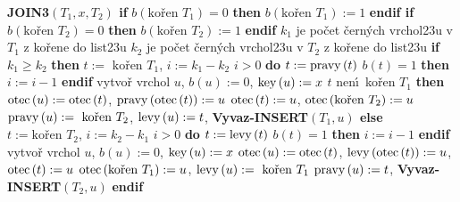 {\bf JOIN3$\left(T_1,x,T_2\right)$\newline 
if} $b\left(\text{ko\v ren }T_1\right)=0$ {\bf then} $b\left(\text{ko\v ren }T_1\right)
:=1$ {\bf endif\newline 
if} $b\left(\text{ko\v ren }T_2\right)=0$ {\bf then} $b\left(\text{ko\v ren }T_2\right)
:=1$ {\bf endif}\newline 
$k_1$ je po\v cet \v cern\'ych vrchol\accent23u v $T_1$ z ko\v rene do list\accent23u \newline 
$k_2$ je po\v cet \v cern\'ych vrchol\accent23u v $T_2$ z ko\v rene do list\accent23u \newline 
{\bf if} $k_1\ge k_2$ {\bf then}\newline 
\phantom{---}$t:=\text{ ko\v ren }T_1$, $i:=k_1-k_2$ \newline 
\phantom{---}{\bf while} $i>0$ {\bf do}\newline 
\phantom{------}$t:=\operatorname{pravy}\left(t\right)$\newline 
\phantom{------}{\bf if} $b\left(t\right)=1$ {\bf then} $i:=i-1$ {\bf endif}\newline 
\phantom{---}{\bf enddo}\newline 
\phantom{---}vytvo\v r vrchol $u$, $b\left(u\right):=0$, $\operatorname{key}\left(u\right):=x$\newline 
\phantom{---}{\bf if} $t$ nen\'\i\ ko\v ren $T_1$ {\bf then}\newline 
\phantom{------}$\operatorname{otec}\left(u\right):=\operatorname{otec}\left(t\right)$, $\operatorname{pravy}\left(\operatorname{otec}\left(t\right)\right):=u$\newline 
\phantom{---}{\bf endif}\newline 
\phantom{---}$\operatorname{otec}\left(t\right):=u$, $\otec\left(\text{ko\v ren }T_2\right):=u$ \newline 
\phantom{---}$\pravy\left(u\right):=\text{ ko\v ren }T_2$, $\operatorname{levy}\left(u\right):=t$, {\bf Vyvaz-INSERT$\left(T_1,u\right)$\newline 
else}\newline 
\phantom{---}$t:=\text{ko\v ren }T_2$, $i:=k_2-k_1$ \newline 
\phantom{---}{\bf while} $i>0$ {\bf do}\newline 
\phantom{------}$t:=\operatorname{levy}\left(t\right)$\newline 
\phantom{------}{\bf if} $b\left(t\right)=1$ {\bf then} $i:=i-1$ {\bf endif}\newline 
\phantom{---}{\bf enddo}\newline 
\phantom{---}vytvo\v r vrchol $u$, $b\left(u\right):=0$, $\operatorname{key}\left(u\right):=x$ \newline 
\phantom{---}$\operatorname{otec}\left(u\right):=\operatorname{otec}\left(t\right)$, $\operatorname{levy}\left(\operatorname{otec}\left(t\right)\right):=u$, $\operatorname{otec}\left(t\right):=u$ \newline 
\phantom{---}$\otec\left(\text{ko\v ren }T_1\right):=u$, $\levy\left(u\right):=\text{ ko\v ren }T_1$ \newline 
\phantom{---}$\operatorname{pravy}\left(u\right):=t$, {\bf Vyvaz-INSERT}$\left(T_2,u\right)$\newline 
{\bf endif}
\medskip

